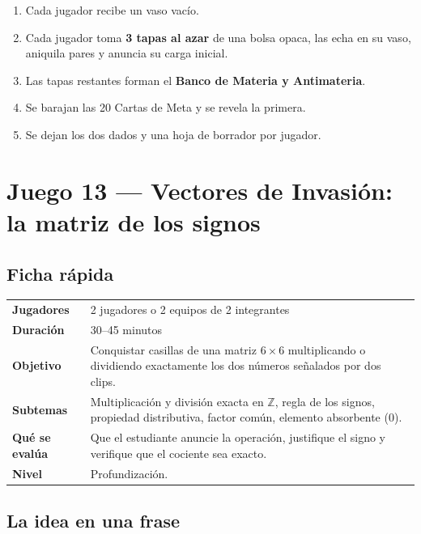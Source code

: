 \documentclass[12pt, letterpaper]{article}
\newcommand{\Z}{\mathbb{Z}}
\begin{document}
\begin{enumerate}[leftmargin=*]
  \item Cada jugador recibe un vaso vacío.
  \item Cada jugador toma \textbf{3 tapas al azar} de una bolsa opaca, las echa en su vaso, aniquila pares y anuncia su carga inicial.
  \item Las tapas restantes forman el \textbf{Banco de Materia y Antimateria}.
  \item Se barajan las 20 Cartas de Meta y se revela la primera.
  \item Se dejan los dos dados y una hoja de borrador por jugador.
\end{enumerate}

\clearpage
\section{Juego 13 — Vectores de Invasión: la matriz de los signos}

\subsection{Ficha rápida}

\begin{center}
\small
\begin{tabular}{@{}p{3cm} p{12.2cm}@{}}
\toprule
\textbf{Jugadores} & 2 jugadores o 2 equipos de 2 integrantes\\
\textbf{Duración} & 30--45 minutos\\
\textbf{Objetivo} & Conquistar casillas de una matriz $6\times 6$ multiplicando o dividiendo exactamente los dos números señalados por dos clips.\\
\textbf{Subtemas} & Multiplicación y división exacta en $\Z$, regla de los signos, propiedad distributiva, factor común, elemento absorbente ($0$).\\
\textbf{Qué se evalúa} & Que el estudiante anuncie la operación, justifique el signo y verifique que el cociente sea exacto.\\
\textbf{Nivel} & Profundización.\\
\bottomrule
\end{tabular}
\end{center}

\subsection{La idea en una frase}
\end{document}
